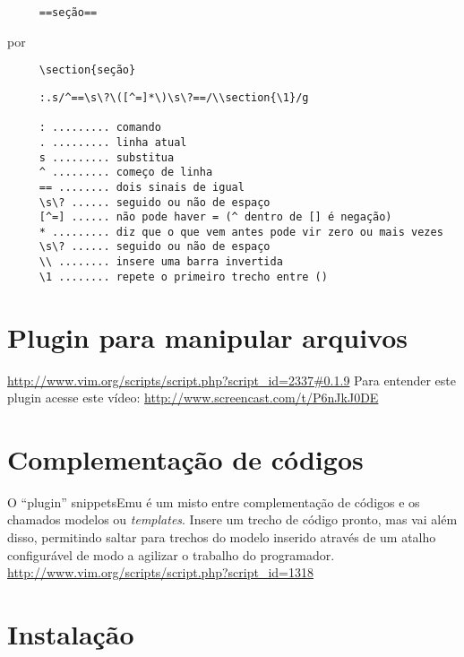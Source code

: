 \begin{verbatim}
     ==seção==
\end{verbatim}

   por

\begin{verbatim}
     \section{seção}
\end{verbatim}

\begin{verbatim}
     :.s/^==\s\?\([^=]*\)\s\?==/\\section{\1}/g
     
     : ......... comando
     . ......... linha atual
     s ......... substitua
     ^ ......... começo de linha
     == ........ dois sinais de igual
     \s\? ...... seguido ou não de espaço
     [^=] ...... não pode haver = (^ dentro de [] é negação)
     * ......... diz que o que vem antes pode vir zero ou mais vezes
     \s\? ...... seguido ou não de espaço
     \\ ........ insere uma barra invertida
     \1 ........ repete o primeiro trecho entre ()
\end{verbatim}

\section{Plugin para manipular arquivos}
\url{http://www.vim.org/scripts/script.php?script_id=2337#0.1.9}
Para entender este plugin acesse este vídeo:
 \url{http://www.screencast.com/t/P6nJkJ0DE}


\section{Complementação de códigos}
\label{Complementação de códigos}

O ``plugin'' snippetsEmu é um misto entre complementação de códigos e
os chamados modelos ou {\em templates}. Insere um trecho de código pronto,
mas vai além disso, permitindo saltar para trechos do modelo inserido
através de um atalho configurável de modo a agilizar o trabalho do
programador. \url{http://www.vim.org/scripts/script.php?script\_id=1318}

\section{Instalação}
\label{Instalação}

